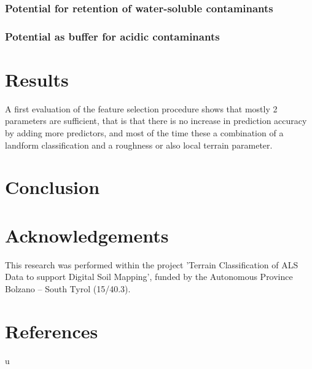 \documentclass[preprint,12pt,authoryear]{elsarticle}
\begin{document}
\subsubsection{Potential for retention of water-soluble contaminants}
\subsubsection{Potential as buffer for acidic contaminants}


\section{Results}
A first evaluation of the feature selection procedure shows that mostly 2 parameters are sufficient, that is that there is no increase in prediction accuracy  by adding more predictors, and most of the time these a combination of a landform classification and a roughness or also local terrain parameter.
\section{Conclusion}
 

\section*{Acknowledgements} This research was performed within the project 'Terrain Classification of ALS Data to support Digital Soil Mapping', funded by the Autonomous Province Bolzano -- South Tyrol (15/40.3).

\section*{References}
u
\end{document}
